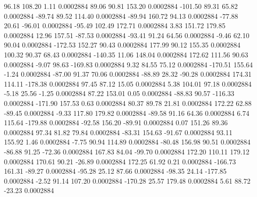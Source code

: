        96.18      108.20        1.11     0.0002884
       89.06       90.81      153.20     0.0002884
     -101.50       89.31       65.82     0.0002884
      -89.74       89.52      114.40     0.0002884
      -89.94      160.72       94.13     0.0002884
      -77.88       20.61      -96.01     0.0002884
      -95.49      102.49      172.71     0.0002884
        3.83      151.72      179.85     0.0002884
       12.96      157.51      -87.53     0.0002884
      -93.41       91.24       64.56     0.0002884
       -9.46       62.10       90.04     0.0002884
     -172.53      152.27       90.43     0.0002884
      177.99       90.12      155.35     0.0002884
      100.32       90.37       68.43     0.0002884
     -140.35       11.06      148.04     0.0002884
      172.62      111.56       90.63     0.0002884
       -9.07       98.63     -169.83     0.0002884
        9.32       84.55       75.12     0.0002884
     -170.51      155.64       -1.24     0.0002884
      -87.00       91.37       70.06     0.0002884
      -88.89       28.32      -90.28     0.0002884
      174.31      114.11     -178.38     0.0002884
       97.45       87.12       15.05     0.0002884
        5.38      104.01       97.18     0.0002884
       -5.18       25.56       -1.25     0.0002884
       87.22      153.01        0.05     0.0002884
      -88.83       90.57     -116.33     0.0002884
     -171.90      157.53        0.63     0.0002884
       80.37       89.78       21.81     0.0002884
      172.22       62.88      -89.45     0.0002884
       -9.33      117.80      179.82     0.0002884
      -89.58       91.16       64.36     0.0002884
        6.74      115.64     -179.88     0.0002884
      -92.58      156.20      -89.91     0.0002884
        0.07      151.26       89.36     0.0002884
       97.34       81.82       79.84     0.0002884
      -83.31      154.63      -91.67     0.0002884
       93.11      155.92        1.46     0.0002884
       -7.75       90.94      114.89     0.0002884
      -80.48      156.98       90.51     0.0002884
      -86.88       91.25      -72.36     0.0002884
      167.83       84.04      -99.70     0.0002884
      172.20      110.11      179.12     0.0002884
      170.61       90.21      -26.89     0.0002884
      172.25       61.92        0.21     0.0002884
     -166.73      161.31      -89.27     0.0002884
      -95.28       25.12       87.66     0.0002884
      -98.35       24.14     -177.85     0.0002884
       -2.52       91.14      107.20     0.0002884
     -170.28       25.57      179.48     0.0002884
        5.61       88.72      -23.23     0.0002884
